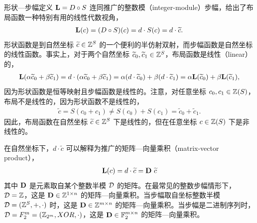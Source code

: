 
形状—步幅定义 $\mathbf{L} = D \circ S$ 连同推广的整数模（integer-module）步幅，给出了布局函数一种特别有用的线性代数视角，
\begin{align}
\mathbf{L}(c) = (D \circ S)(c) = d \cdot S(c) = d \cdot \widetilde{c}.
\end{align}
形状函数是到自然坐标 $\widetilde{c} \in \mathbb{Z}^S$ 的一个便利的半仿射双射，而步幅函数是自然坐标的线性函数。事实上，对于两个自然坐标 $\widetilde{c}_0, \widetilde{c}_1 \in \mathbb{Z}^S$，布局函数是线性（linear）的，
\begin{align*}
\mathbf{L}(\alpha \widetilde{c}_0 + \beta \widetilde{c}_1) = d \cdot (\alpha \widetilde{c}_0 + \beta \widetilde{c}_1) = \alpha (d \cdot \widetilde{c}_0) + \beta (d \cdot \widetilde{c}_1) = \alpha \mathbf{L}(\widetilde{c}_0) + \beta \mathbf{L}(\widetilde{c}_1),
\end{align*}
因为形状函数是恒等映射且步幅函数是线性的。注意，对任意坐标 $c_0, c_1 \in \mathbb{Z}(S)$，布局不是线性的，因为形状函数不是线性的，
\begin{align*}
\tilde{c} = S(c_0 + c_1) \neq S(c_0) + S(c_1) = \tilde{c}_0 + \tilde{c}_1.
\end{align*}
因此，布局函数在自然坐标 $\widetilde{c} \in \mathbb{Z}^S$ 下是线性的，但在任意坐标 $c \in \mathbb{Z}(S)$ 下是非线性的。

在自然坐标下，$d \cdot \tilde{c}$ 可以解释为推广的矩阵—向量乘积（matrix-vector product），
\begin{align*}
\mathbf{L}(c) = d \cdot \widetilde{c} = \mathbf{D} \ \widetilde{c}
\end{align*}
其中 $\mathbf{D}$ 是元素取自某个整数半模 $\mathcal{D}$ 的矩阵。在最常见的整数步幅情形下，$\mathcal{D} = \mathbb{Z}$，这是 $\mathbf{D} \in \mathbb{Z}^{1 \times n}$ 的矩阵—向量乘积。当步幅取自坐标整数半模 $\mathcal{D} = (\mathbb{Z}^S, +, \cdot)$ 时，这是 $\mathbf{D} \in \mathbb{Z}^{m \times n}$ 的矩阵—向量乘积。当步幅是二进制序列时，$\mathcal{D} = F_2^m = (\mathbb{Z}_{2^m}, XOR, \cdot)$，这是 $\mathbf{D} \in \mathbb{F}_2^{m \times n}$ 的矩阵—向量乘积。

